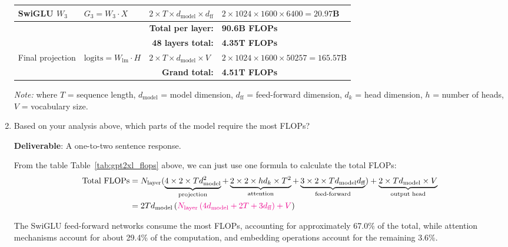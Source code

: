 \begin{enumerate}[label=(\alph*)]
\begin{table}[h]
{\begin{tabular}{llll}
    SwiGLU $W_3$ & $G_3 = W_3 \cdot X$ & $2 \times T \times d_{\text{model}} \times d_{\text{ff}}$ & $2 \times 1024 \times 1600 \times 6400 = 20.97$B \\
    \midrule
    \multicolumn{3}{r}{\textbf{Total per layer:}} & \textbf{90.6B FLOPs} \\
    \multicolumn{3}{r}{\textbf{48 layers total:}} & \textbf{4.35T FLOPs} \\
    \midrule
    Final projection & $\text{logits} = W_{\text{lm}} \cdot H$ & $2 \times T \times d_{\text{model}} \times V$ & $2 \times 1024 \times 1600 \times 50257 = 165.57$B \\
    \midrule
    \multicolumn{3}{r}{\textbf{Grand total:}} & \textbf{4.51T FLOPs} \\
    \bottomrule
    \end{tabular}
    }
    \end{table}
    {\small\textit{Note:} where $T$ = sequence length, $d_{\text{model}}$ = model dimension, $d_{\text{ff}}$ = feed-forward dimension, $d_k$ = head dimension, $h$ = number of heads, $V$ = vocabulary size.}
    
    \item Based on your analysis above, which parts of the model require the most FLOPs?
    
    \textbf{Deliverable}: A one-to-two sentence response.
    
    \begin{answer}
    From the table Table~\ref{tab:gpt2xl_flops} above, we can just use one formula to calculate the total FLOPs:
    \begin{equation*}
        \begin{aligned}
            \text{Total FLOPs} &= N_{\text{layer}} (
                \underbrace{4 \times 2 \times T d_{\text{model}}^2}_{\text{projection}} + 
                \underbrace{2 \times 2 \times h d_{k} \times T^2}_{\text{attention}} + 
                \underbrace{3 \times 2 \times T d_{\text{model}} d_{\text{ff}}}_{\text{feed-forward}}) + \underbrace{2 \times T d_{\text{model}} \times V}_{\text{output head}} \\
            &= 2 T d_{\text{model}} \left(
                {\color{magenta}N_{\text{layer}}  \left(
                    4 d_{\text{model}} + 2 T + 3 d_{\text{ff}}
                \right) + V}
            \right)
        \end{aligned}
    \end{equation*}

    The SwiGLU feed-forward networks consume the most FLOPs, accounting for approximately 67.0\% of the total, while attention mechanisms account for about 29.4\% of the computation, and embedding operations account for the remaining 3.6\%.
    \end{answer}
    

\end{enumerate}
